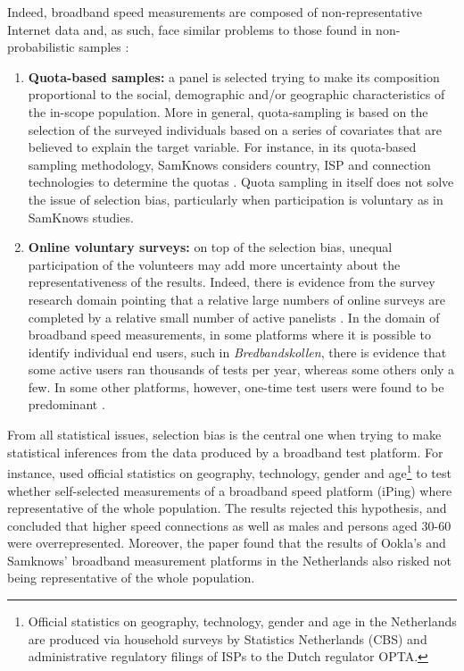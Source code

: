 \documentclass[12pt]{article}
\begin{document}
Indeed, broadband speed measurements are composed of non-representative Internet data and, as such, face similar problems to those found in non-probabilistic samples \citep{couper2013,zagheni2015}:

\begin{enumerate}
	\item \textbf{Quota-based samples:} a panel is selected trying to make its composition proportional to the social, demographic and/or geographic characteristics of the in-scope population. More in general, quota-sampling is based on the selection of the surveyed individuals based on a series of covariates that are believed to explain the target variable. For instance, in its quota-based sampling methodology, SamKnows considers country, ISP and connection technologies to determine the quotas \citep{samknows2013}. Quota sampling in itself does not solve the issue of selection bias, particularly when participation is voluntary as in SamKnows studies.
	
	\item \textbf{Online voluntary surveys:} on top of the selection bias, unequal participation of the volunteers may add more uncertainty about the representativeness of the results. Indeed,  there is evidence from the survey research domain pointing that a relative large numbers of online surveys are completed by a relative small number of active panelists \citep{couper2013}. In the domain of broadband speed measurements, in some platforms where it is possible to identify individual end users, such in \textit{Bredbandskollen}, there is evidence that some active users ran thousands of tests per year, whereas some others only a few. In some other platforms, however, one-time test users were found to be predominant \citep{wattegama2011}. 
\end{enumerate}
	
From all statistical issues, selection bias is the central one when trying to make statistical inferences from the data produced by a broadband test platform. For instance, \cite{opt2012} used official statistics on geography, technology, gender and age\footnote{Official statistics on geography, technology, gender and age in the Netherlands are produced via household surveys by Statistics Netherlands (CBS) and administrative regulatory filings of ISPs to the Dutch regulator OPTA.} to test whether self-selected measurements of a broadband speed platform (iPing) where representative of the whole population. The results rejected this hypothesis, and concluded that higher speed connections as well as males and persons aged 30-60 were overrepresented. Moreover, the paper found that the results of Ookla's and Samknows' broadband measurement platforms in the Netherlands also risked not being representative of the whole population.
\end{document}

